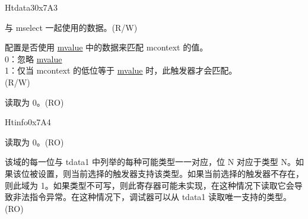 \begin{register}{H}{tdata3}{0x7A3}\label{regdesc:TDATA3}
%
%
%
\regnewline%
\begin{regdesc}\begin{reglist}
\label{fielddesc:MVALUE}\item [mvalue] 与 mselect 一起使用的数据。(R/W)
\label{fielddesc:MSELECT}\item [mselect] 配置是否使用 \hyperref[fielddesc:MVALUE]{mvalue} 中的数据来匹配 mcontext 的值。\\
0：忽略 \hyperref[fielddesc:MVALUE]{mvalue}\\
1：仅当 mcontext 的低位等于 \hyperref[fielddesc:MVALUE]{mvalue} 时，此触发器才会匹配。\\
(R/W)
\label{fielddesc:tdata3_rsvd}\item [Reserved] 读取为 0。(RO)
\end{reglist}\end{regdesc}
\end{register}

\begin{register}{H}{tinfo}{0x7A4}\label{regdesc:TINFO}
%
%
\regnewline%
\begin{regdesc}\begin{reglist}
\label{fielddesc:tinfo_rsvd}\item [Reserved] 读取为 0。(RO)
\label{fielddesc:INFO}\item [info] 该域的每一位与 tdata1 中列举的每种可能类型一一对应，位 N 对应于类型 N。如果该位被设置，则当前选择的触发器支持该类型。如果当前选择的触发器不存在，则此域为 1。如果类型不可写，则此寄存器可能未实现，在这种情况下读取它会导致非法指令异常。在这种情况下，调试器可以从 tdata1 读取唯一支持的类型。(RO)
\end{reglist}\end{regdesc}
\end{register}

